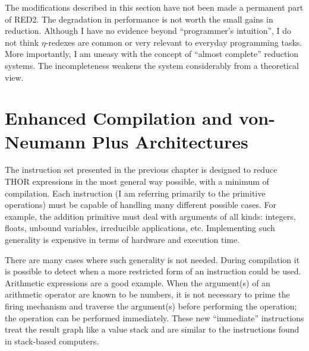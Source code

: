 The modifications described in this section have not been made a permanent part
of RED2. The degradation in performance is not worth the small gains in
reduction. Although I have no evidence beyond ``programmer's intuition'', I do
not think \(\eta\)-redexes are common or very relevant to everyday programming
tasks. More importantly, I am uneasy with the concept of ``almost complete''
reduction systems. The incompleteness weakens the system considerably from a
theoretical view.

\section[Enhanced Compilation]{Enhanced Compilation and von-Neumann Plus Architectures}

The instruction set presented in the previous chapter is designed to reduce THOR
expressions in the most general way possible, with a minimum of compilation.
Each instruction (I am referring primarily to the primitive operations) must be
capable of handling many different possible cases. For example, the addition
primitive must deal with arguments of all kinds: integers, floats, unbound
variables, irreducible applications, etc. Implementing such generality is
expensive in terms of hardware and execution time.

There are many cases where such generality is not needed. During compilation it
is possible to detect when a more restricted form of an instruction could be
used. Arithmetic expressions are a good example. When the argument(s) of an
arithmetic operator are known to be numbers, it is not necessary to prime the
firing mechanism and traverse the argument(s) before performing the operation;
the operation can be performed immediately. These new ``immediate''
instructions treat the result graph like a value stack and are similar to the
instructions found in stack-based computers.

